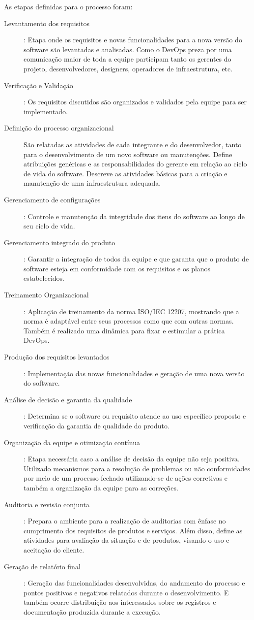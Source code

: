 \documentclass[	DIV=calc,%
							paper=a4,%
							fontsize=12pt,%
							onecolumn]{scrartcl}	 					%
\begin{document}
As etapas definidas para o processo foram:

 \begin{description}
	\item[Levantamento dos requisitos]: Etapa onde os requisitos e novas funcionalidades para a nova versão do software são levantadas e analisadas. Como o DevOps preza por uma comunicação maior de toda a equipe participam tanto os gerentes do projeto, desenvolvedores, designers, operadores de infraestrutura, etc.
	\item[Verificação e Validação]: Os requisitos discutidos são organizados e validados pela equipe para ser implementado.
	\item[Definição do processo organizacional] São relatadas as atividades de cada integrante e do desenvolvedor, tanto para o desenvolvimento de um novo software ou manutenções. Define atribuições genéricas e as responsabilidades do gerente em relação ao ciclo de vida do software. Descreve as atividades básicas para a criação e manutenção de uma infraestrutura adequada.
	\item[Gerenciamento de configurações]: Controle e manutenção da integridade dos itens do software ao longo de seu ciclo de vida.
	\item[Gerenciamento integrado do produto]: Garantir a integração de todos da equipe e que garanta que o produto de software esteja em conformidade com os requisitos e os planos estabelecidos.
	\item[Treinamento Organizacional]:  Aplicação de treinamento da norma ISO/IEC 12207, mostrando que a norma é adaptável entre seus processos como que com outras normas. Também é realizado uma dinâmica para fixar e estimular a prática DevOps.
	\item[Produção dos requisitos levantados]: Implementação das novas funcionalidades e geração de uma nova versão do software.
	\item[Análise de decisão e garantia da qualidade]: Determina se o software ou requisito atende ao uso específico proposto e verificação da garantia de qualidade do produto.
	\item[Organização da equipe e otimização contínua]: Etapa necessária caso a análise de decisão da equipe não seja positiva. Utilizado mecanismos para a resolução de problemas ou não conformidades por meio de um processo fechado utilizando-se de ações corretivas e também a organização da equipe para as correções.
	\item[Auditoria e revisão conjunta]: Prepara o ambiente para a realização de auditorias com ênfase no cumprimento dos requisitos de produtos e serviços. Além disso, define as atividades para avaliação da situação e de produtos, visando o uso e aceitação do cliente.
	\item[Geração de relatório final]: Geração das funcionalidades desenvolvidas, do andamento do processo e pontos positivos e negativos relatados durante o desenvolvimento. E também ocorre distribuição aos interessados sobre os registros e documentação produzida durante a execução.
\end{description}
\end{document}
